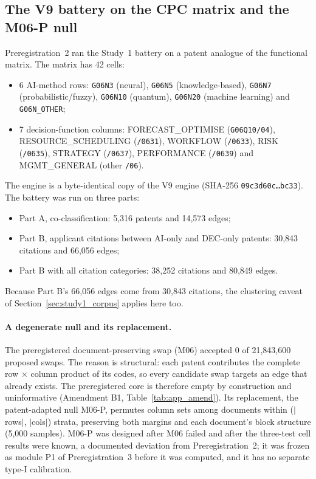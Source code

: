 \subsection{The V9 battery on the CPC matrix and the M06-P null}
\label{sec:study2_cells}

Preregistration~2 ran the Study~1 battery on a patent analogue of the functional matrix. The matrix has 42 cells:
\begin{itemize}
  \item 6 AI-method rows: \texttt{G06N3} (neural), \texttt{G06N5} (knowledge-based), \texttt{G06N7} (probabilistic/fuzzy), \texttt{G06N10} (quantum), \texttt{G06N20} (machine learning) and \texttt{G06N\_OTHER};
  \item 7 decision-function columns: FORECAST\_\allowbreak OPTIMISE (\texttt{G06Q10/04}), RESOURCE\_\allowbreak SCHEDULING (\texttt{/0631}), WORKFLOW (\texttt{/0633}), RISK (\texttt{/0635}), STRATEGY (\texttt{/0637}), PERFORMANCE (\texttt{/0639}) and MGMT\_\allowbreak GENERAL (other \texttt{/06}).
\end{itemize}
The engine is a byte-identical copy of the V9 engine (SHA-256 \texttt{09c3d60c\ldots bc33}). The battery was run on three parts:
\begin{itemize}
  \item Part A, co-classification: 5,316 patents and 14,573 edges;
  \item Part B, applicant citations between AI-only and DEC-only patents: 30,843 citations and 66,056 edges;
  \item Part B with all citation categories: 38,252 citations and 80,849 edges.
\end{itemize}
Because Part B's 66,056 edges come from 30,843 citations, the clustering caveat of Section~\ref{sec:study1_corpus} applies here too.

\paragraph{A degenerate null and its replacement.} The preregistered document-preserving swap (M06) accepted 0 of 21,843,600 proposed swaps. The reason is structural: each patent contributes the complete row $\times$ column product of its codes, so every candidate swap targets an edge that already exists. The preregistered core is therefore empty by construction and uninformative (Amendment B1, Table~\ref{tab:app_amend}). Its replacement, the patent-adapted null M06-P, permutes column sets among documents within ($|$rows$|$, $|$cols$|$) strata, preserving both margins and each document's block structure (5,000 samples). M06-P was designed after M06 failed and after the three-test cell results were known, a documented deviation from Preregistration~2; it was frozen as module P1 of Preregistration~3 before it was computed, and it has no separate type-I calibration.

